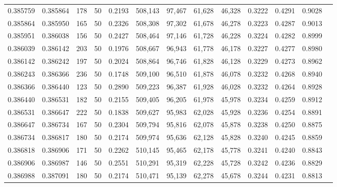 \begin{tabular}{rrrrrrrrrrrrr}
0.385759 & 0.385864 &   178 &  50 &                                     0.2193 & 508,143 &  97,467 &  61,628 &  46,328 & 0.3222 & 0.4291 & 0.9028 \\
0.385864 & 0.385950 &   165 &  50 &                                     0.2326 & 508,308 &  97,302 &  61,678 &  46,278 & 0.3223 & 0.4287 & 0.9013 \\
0.385951 & 0.386038 &   156 &  50 &                                     0.2427 & 508,464 &  97,146 &  61,728 &  46,228 & 0.3224 & 0.4282 & 0.8999 \\
0.386039 & 0.386142 &   203 &  50 &                                     0.1976 & 508,667 &  96,943 &  61,778 &  46,178 & 0.3227 & 0.4277 & 0.8980 \\
0.386142 & 0.386242 &   197 &  50 &                                     0.2024 & 508,864 &  96,746 &  61,828 &  46,128 & 0.3229 & 0.4273 & 0.8962 \\
0.386243 & 0.386366 &   236 &  50 &                                     0.1748 & 509,100 &  96,510 &  61,878 &  46,078 & 0.3232 & 0.4268 & 0.8940 \\
0.386366 & 0.386440 &   123 &  50 &                                     0.2890 & 509,223 &  96,387 &  61,928 &  46,028 & 0.3232 & 0.4264 & 0.8928 \\
0.386440 & 0.386531 &   182 &  50 &                                     0.2155 & 509,405 &  96,205 &  61,978 &  45,978 & 0.3234 & 0.4259 & 0.8912 \\
0.386531 & 0.386647 &   222 &  50 &                                     0.1838 & 509,627 &  95,983 &  62,028 &  45,928 & 0.3236 & 0.4254 & 0.8891 \\
0.386647 & 0.386734 &   167 &  50 &                                     0.2304 & 509,794 &  95,816 &  62,078 &  45,878 & 0.3238 & 0.4250 & 0.8875 \\
0.386734 & 0.386817 &   180 &  50 &                                     0.2174 & 509,974 &  95,636 &  62,128 &  45,828 & 0.3240 & 0.4245 & 0.8859 \\
0.386818 & 0.386906 &   171 &  50 &                                     0.2262 & 510,145 &  95,465 &  62,178 &  45,778 & 0.3241 & 0.4240 & 0.8843 \\
0.386906 & 0.386987 &   146 &  50 &                                     0.2551 & 510,291 &  95,319 &  62,228 &  45,728 & 0.3242 & 0.4236 & 0.8829 \\
0.386988 & 0.387091 &   180 &  50 &                                     0.2174 & 510,471 &  95,139 &  62,278 &  45,678 & 0.3244 & 0.4231 & 0.8813 \\

\end{tabular}
